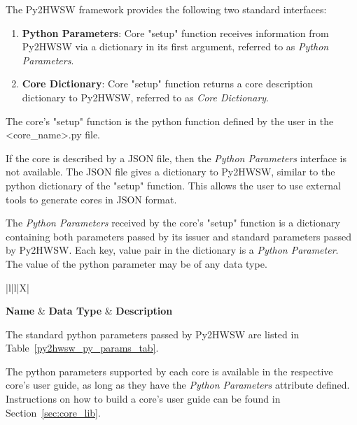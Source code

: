 %

The Py2HWSW framework provides the following two standard interfaces:
\begin{enumerate}
  \item \textbf{Python Parameters}: Core "setup" function receives information from Py2HWSW via a dictionary in its first argument, referred to as \textit{Python Parameters}.
  \item \textbf{Core Dictionary}: Core "setup" function returns a core description dictionary to Py2HWSW, referred to as \textit{Core Dictionary}.
\end{enumerate}

The core's "setup" function is the python function defined by the user in the <core\_name>.py file.

If the core is described by a JSON file, then the \textit{Python Parameters} interface is not available.
The JSON file gives a dictionary to Py2HWSW, similar to the python dictionary of the "setup" function.
This allows the user to use external tools to generate cores in JSON format.

%
%

The \textit{Python Parameters} received by the core's "setup" function is a dictionary containing both parameters passed by its issuer and standard parameters passed by Py2HWSW.
Each key, value pair in the dictionary is a \textit{Python Parameter}.
The value of the python parameter may be of any data type.

{
\setlength{\LTcapwidth}{\linewidth} %
\begin{xltabular}{\textwidth}{|l|l|X|}

  \hline
  {\bf Name} & {\bf Data Type} & {\bf Description}  \\ \hline \hline
  \endfirsthead
  \hline
  \caption{Standard \textit{Python Parameters} passed by Py2HWSW to every core's "setup" function.}
  \endlastfoot

  

\end{xltabular}
\label{py2hwsw_py_params_tab}
}

The standard python parameters passed by Py2HWSW are listed in Table~\ref{py2hwsw_py_params_tab}.

The python parameters supported by each core is available in the respective core's user guide, as long as they have the \textit{Python Parameters} attribute defined.
Instructions on how to build a core's user guide can be found in Section~\ref{sec:core_lib}. 


